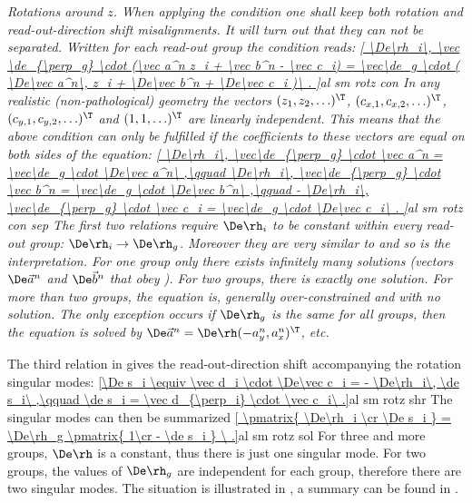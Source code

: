 
\em{Rotations around $z$}. When applying the condition  one shall keep both rotation and read-out-direction shift misalignments. It will turn out that they can not be separated. Written for each read-out group the condition reads:
\eqref{
	\De\rh_i\, \vec \de_{\perp_g} \cdot (\vec a^n z_i + \vec b^n - \vec c_i) =
	\vec\de_g \cdot (
		\De\vec a^n\, z_i +
		\De\vec b^n +
		\De\vec c_i
	)\ .
}{al sm rotz con}
In any realistic (non-pathological) geometry the vectors $(z_1, z_2, \ldots)^\T$, $(c_{x,1}, c_{x,2}, \ldots)^\T$, $(c_{y,1}, c_{y,2},\ldots)^\T$ and $(1, 1, \ldots)^\T$ are linearly independent. This means that the above condition can only be fulfilled if the coefficients to these vectors are equal on both sides of the equation:
\eqref{
	\De\rh_i\, \vec\de_{\perp_g} \cdot \vec a^n = \vec\de_g \cdot \De\vec a^n\ ,\qquad
	\De\rh_i\, \vec\de_{\perp_g} \cdot \vec b^n = \vec\de_g \cdot \De\vec b^n\ ,\qquad
	- \De\rh_i\, \vec\de_{\perp_g} \cdot \vec c_i = \vec\de_g \cdot \De\vec c_i\ .
}{al sm rotz con sep}
The first two relations require $\De\rh_i$ to be constant within every read-out group: $\De\rh_i \rightarrow \De\rh_g$. Moreover they are very similar to  and so is the interpretation. For one group only there exists infinitely many solutions (vectors $\De\vec a^n$ and $\De\vec b^n$ that obey ). For two groups, there is exactly one solution. For more than two groups, the equation is, generally over-constrained and with no solution. The only exception occurs if $\De\rh_g$ is the same for all groups, then the equation is solved by $\De\vec a^n = \De\rh (-a^n_y, a^n_x)^\T$, etc.

The third relation in  gives the read-out-direction shift accompanying the rotation singular modes:
\eqref{\De s_i \equiv \vec d_i \cdot \De\vec c_i = - \De\rh_i\, \de s_i\ ,\qquad \de s_i = \vec d_{\perp_i} \cdot \vec c_i\ .}{al sm rotz shr}
The singular modes can then be summarized
\eqref{
\pmatrix{
	\De\rh_i \cr
	\De s_i
	}
= \De\rh_g \pmatrix{
	1\cr
	- \de s_i
}
\ .}{al sm rotz sol}
For three and more groups, $\De\rh$ is a constant, thus there is just one singular mode. For two groups, the values of $\De\rh_g$ are independent for each group, therefore there are two singular modes. The situation is illustrated in , a summary can be found in .

